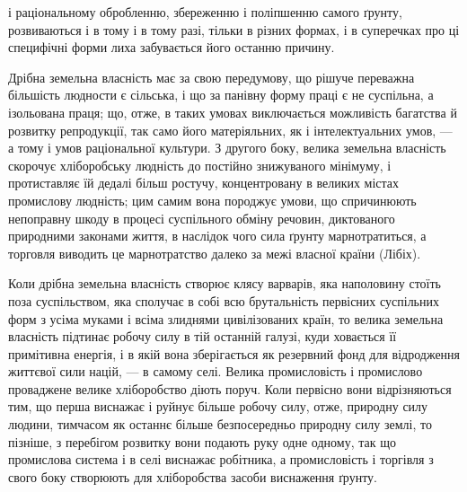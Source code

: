 \parcont{}  %
і раціональному обробленню, збереженню і поліпшенню самого ґрунту, розвиваються
і в тому і в тому разі, тільки в різних формах, і в суперечках про ці специфічні
форми лиха забувається його останню причину.

Дрібна земельна власність має за свою передумову, що рішуче переважна
більшість людности є сільська, і що за панівну форму праці є не суспільна, а ізольована
праця; що, отже, в таких умовах виключається можливість багатства й розвитку
репродукції, так само його матеріяльних, як і інтелектуальних умов, — а тому
і умов раціональної культури. З другого боку, велика земельна власність скорочує
хліборобську людність до постійно знижуваного мінімуму, і протиставляє
їй дедалі більш ростучу, концентровану в великих містах промислову людність;
цим самим вона породжує умови, що спричинюють непоправну шкоду в процесі
суспільного обміну речовин, диктованого природними законами життя, в наслідок
чого сила ґрунту марнотратиться, а торговля виводить це марнотратство далеко
за межі власної країни (Лібіх).

Коли дрібна земельна власність створює клясу варварів, яка наполовину
стоїть поза суспільством, яка сполучає в собі всю брутальність первісних суспільних
форм з усіма муками і всіма злиднями цивілізованих країн, то велика
земельна власність підтинає робочу силу в тій останній галузі, куди ховається
її примітивна енергія, і в якій вона зберігається як резервний фонд для відродження
життєвої сили націй, — в самому селі. Велика промисловість і промислово
проваджене велике хліборобство діють поруч. Коли первісно вони відрізняються
тим, що перша виснажає і руйнує більше робочу силу, отже, природну
силу людини, тимчасом як останнє більше безпосередньо природну силу землі,
то пізніше, з перебігом розвитку вони подають руку одне одному, так що промислова
система і в селі виснажає робітника, а промисловість і торгівля з свого
боку створюють для хліборобства засоби виснаження ґрунту.
